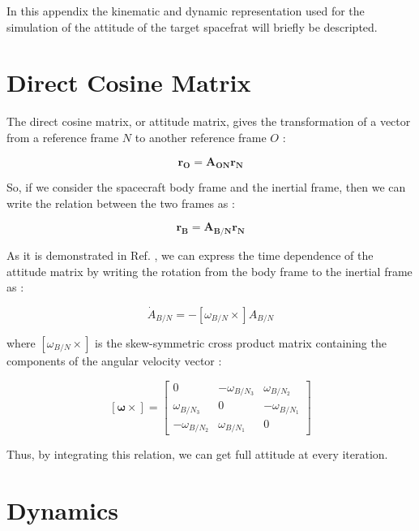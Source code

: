 In this appendix the kinematic and dynamic representation used for the simulation of the attitude of the target spacefrat will briefly be descripted.

\section{Direct Cosine Matrix}
The direct cosine matrix, or attitude matrix, gives the transformation of a vector from a reference frame $N$ to another reference frame $O$ : 

\begin{equation}
 \mathbf{r_{O}} = \mathbf{A_{ON}} \mathbf{r_{N}}
\end{equation}

So, if we consider the spacecraft body frame and the inertial frame, then we can write the relation between the two frames as : 

\begin{equation}
 \mathbf{r_{B}} = \mathbf{A_{B/N}} \mathbf{r_{N}}
\end{equation}

As it is demonstrated in Ref. \cite{Markley2014}, we can express the time dependence of the attitude matrix by writing the rotation from the body frame to the inertial frame as : 

\begin{equation}
 \dot{A}_{B/N}= - [\omega_{B/N} \times]A_{B/N} 
\end{equation}

where $[\omega_{B/N} \times]$ is the skew-symmetric cross product matrix containing the components of the angular velocity vector : 

\begin{equation*}
 \mathbf{[\omega \times]} =
                                \begin{bmatrix}
                                    0 & -\omega_{B/N_{3}} & \omega_{B/N_{2}} \\
                                    \omega_{B/N_{3}} & 0 & -\omega_{B/N_{1}} \\
                                    -\omega_{B/N_{2}} & \omega_{B/N_{1}} & 0
                                \end{bmatrix}
\end{equation*}

Thus, by integrating this relation, we can get full attitude at every iteration.

\section{Dynamics}
